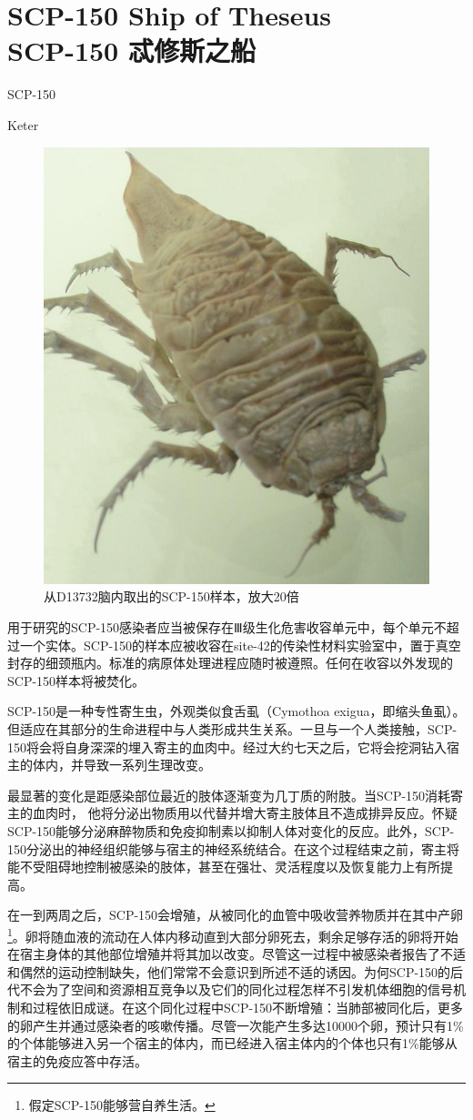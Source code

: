 \chapter[SCP-150 忒修斯之船]{
SCP-150 Ship of Theseus\\
SCP-150 忒修斯之船
}

\label{chap:SCP-150}

SCP-150

Keter

\begin{figure}[H]
\centering
\includegraphics[width=0.5\linewidth]{images/SCP-150.jpg}
\caption*{从D13732脑内取出的SCP-150样本，放大20倍}
\end{figure}

用于研究的SCP-150感染者应当被保存在Ⅲ级生化危害收容单元中，每个单元不超过一个实体。SCP-150的样本应被收容在site-42的传染性材料实验室中，置于真空封存的细颈瓶内。标准的病原体处理进程应随时被遵照。任何在收容以外发现的SCP-150样本将被焚化。

SCP-150是一种专性寄生虫，外观类似食舌虱（Cymothoa exigua，即缩头鱼虱）。但适应在其部分的生命进程中与人类形成共生关系。一旦与一个人类接触，SCP-150将会将自身深深的埋入寄主的血肉中。经过大约七天之后，它将会挖洞钻入宿主的体内，并导致一系列生理改变。

最显著的变化是距感染部位最近的肢体逐渐变为几丁质的附肢。当SCP-150消耗寄主的血肉时， 他将分泌出物质用以代替并增大寄主肢体且不造成排异反应。怀疑SCP-150能够分泌麻醉物质和免疫抑制素以抑制人体对变化的反应。此外，SCP-150分泌出的神经组织能够与宿主的神经系统结合。在这个过程结束之前，寄主将能不受阻碍地控制被感染的肢体，甚至在强壮、灵活程度以及恢复能力上有所提高。

在一到两周之后，SCP-150会增殖，从被同化的血管中吸收营养物质并在其中产卵\footnote{假定SCP-150能够营自养生活。}。卵将随血液的流动在人体内移动直到大部分卵死去，剩余足够存活的卵将开始在宿主身体的其他部位增殖并将其加以改变。尽管这一过程中被感染者报告了不适和偶然的运动控制缺失，他们常常不会意识到所述不适的诱因。为何SCP-150的后代不会为了空间和资源相互竞争以及它们的同化过程怎样不引发机体细胞的信号机制和过程依旧成谜。在这个同化过程中SCP-150不断增殖：当肺部被同化后，更多的卵产生并通过感染者的咳嗽传播。尽管一次能产生多达10000个卵，预计只有1\%的个体能够进入另一个宿主的体内，而已经进入宿主体内的个体也只有1\%能够从宿主的免疫应答中存活。

